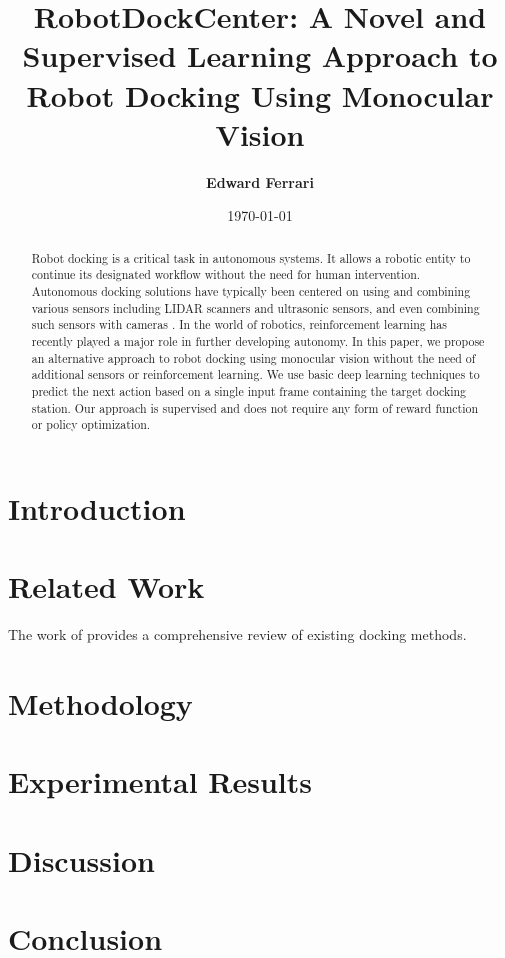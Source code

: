 \documentclass{article}
\begin{document}
\title{\textbf{RobotDockCenter: A Novel and Supervised Learning Approach to Robot Docking Using Monocular Vision}}
\author{\textbf{Edward Ferrari}}
\date{\today}

\maketitle

\begin{abstract}
Robot docking is a critical task in autonomous systems. 
It allows a robotic entity to continue its designated workflow without the need for human intervention. 
Autonomous docking solutions have typically been centered on using and combining various sensors including LIDAR scanners and ultrasonic sensors, and even combining such sensors with cameras \citep{app131910675}. 
In the world of robotics, reinforcement learning has recently played a major role in further developing autonomy. 
In this paper, we propose an alternative approach to robot docking using monocular vision without the need of additional sensors or reinforcement learning. 
We use basic deep learning techniques to predict the next action based on a single input frame containing the target docking station.
Our approach is supervised and does not require any form of reward function or policy optimization.
\end{abstract}

\section{Introduction}

\section{Related Work}
The work of \citet{app131910675} provides a comprehensive review of existing docking methods.

\section{Methodology}

\section{Experimental Results}

\section{Discussion}

\section{Conclusion}



\end{document}
